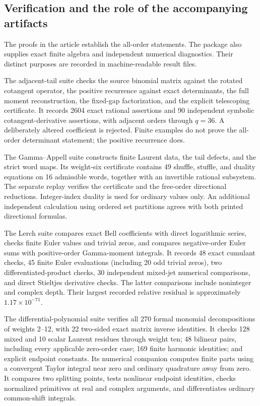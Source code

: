 \documentclass[11pt,a4paper]{article}
\numberwithin{equation}{section}
\theoremstyle{definition}
\theoremstyle{remark}
\begin{document}
\subsection{Verification and the role of the accompanying artifacts}
\label{audit:verification}

The proofs in the article establish the all-order statements. The
package also supplies exact finite algebra and independent numerical
diagnostics. Their distinct purposes are recorded in machine-readable
result files.

The adjacent-tail suite checks the source binomial matrix against the
rotated cotangent operator, the positive recurrence against exact
determinants, the full moment reconstruction, the fixed-gap
factorization, and the explicit telescoping certificate.
It records 2604 exact rational assertions and 90 independent symbolic
cotangent-derivative assertions, with adjacent orders through $q=36$.
A deliberately altered coefficient is rejected. Finite examples do not
prove the all-order determinant statement; the positive recurrence does.

The Gamma--Appell suite constructs finite Laurent data, the tail defects,
and the strict word maps. Its weight-six certificate contains 49
shuffle, stuffle, and duality equations on 16 admissible words, together
with an invertible rational subsystem. The separate replay verifies the
certificate and the free-order directional reductions. Integer-index
duality is used for ordinary values only. An additional independent
calculation using ordered set partitions agrees with both printed
directional formulas.

The Lerch suite compares exact Bell coefficients with direct logarithmic
series, checks finite Euler values and trivial zeros, and compares
negative-order Euler sums with positive-order Gamma-moment integrals.
It records 48 exact cumulant checks, 45 finite Euler evaluations
(including 20 odd trivial zeros), two differentiated-product checks,
30 independent mixed-jet numerical comparisons, and direct Stieltjes
derivative checks. The latter comparisons include noninteger and complex
depth. Their largest recorded relative residual is approximately
$1.17\times10^{-71}$.

The differential-polynomial suite verifies all 270 formal monomial
decompositions of weights 2--12, with 22 two-sided exact matrix inverse
identities. It checks 128 mixed and 10 scalar Laurent residues through
weight ten; 48 bilinear pairs, including every applicable zero-order
case; 169 finite harmonic identities; and explicit endpoint constants.
Its numerical companion computes finite parts using a convergent Taylor
integral near zero and ordinary quadrature away from zero. It compares
two splitting points, tests nonlinear endpoint identities, checks
normalized primitives at real and complex arguments, and differentiates
ordinary common-shift integrals.
\end{document}
